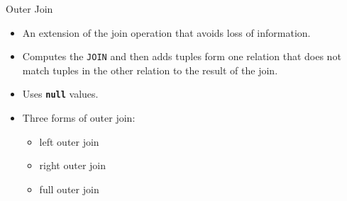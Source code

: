 \documentclass[aspectratio=169]{beamer}
\begin{document}
\begin{frame}{Outer Join}
    \begin{itemize}
        \item An extension of the join operation that avoids loss of information.
        \item Computes the \texttt{JOIN} and then adds tuples form one relation that does not match tuples in the other relation to the result of the join.
        \item Uses \textbf{\texttt{null}} values.
        \item Three forms of outer join:
        \begin{itemize}
            \item left outer join
            \item right outer join
            \item full outer join
        \end{itemize}
    \end{itemize}
\end{frame}
\end{document}
